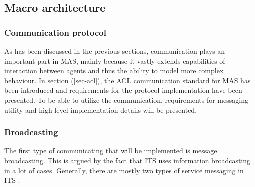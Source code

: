 \documentclass[main.tex]{subfiles}
\begin{document}

\pagebreak



\subsection{Macro architecture}

\subsubsection{Communication protocol}

As has been discussed in the previous sections, communication plays an important part in 
MAS, mainly because it vastly extends capabilities of interaction between agents and thus 
the ability to model more complex behaviour. In section (\ref{sec-acl}), the ACL communication 
standard for MAS has been introduced and requirements for the protocol implementation have 
been presented. To be able to 
utilize the communication, requirements for messaging utility and high-level implementation 
details will be presented. 

\subsubsection{Broadcasting}

The first type of communicating that will be implemented is message broadcasting. This is 
argued by the fact that ITS uses information broadcasting in a lot of cases.
Generally, there are mostly two types of service messaging in ITS \cite{Santa2013}:
\end{document}
